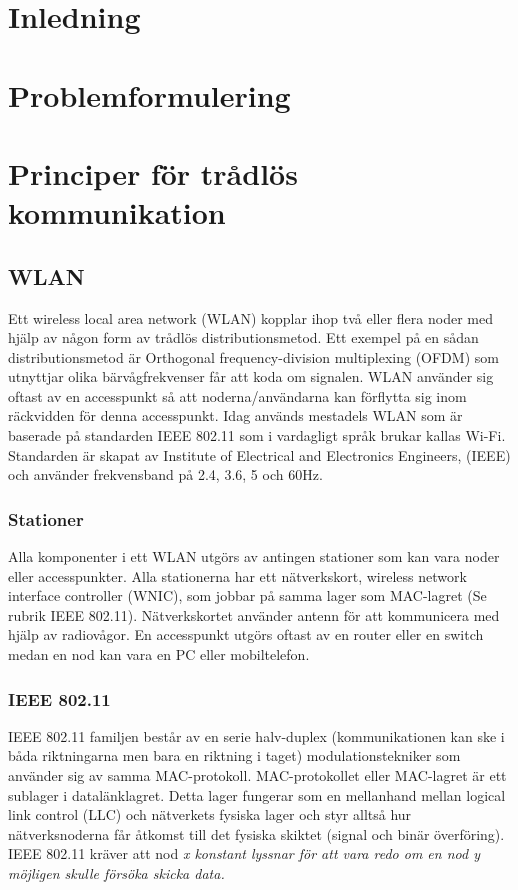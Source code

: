 \documentclass[a4paper,12pt,fleqn]{article}
\begin{document}
\addto\captionsswedish{\renewcommand{\contentsname}{Innehållsförteckning}}

\tableofcontents
\thispagestyle{fancy}
\newpage

\section{Inledning}
\section{Problemformulering}
\section{Principer för trådlös kommunikation}
\subsection{WLAN}
Ett wireless local area network (WLAN) kopplar ihop två eller flera noder med hjälp av någon form av trådlös distributionsmetod. Ett exempel på en sådan distributionsmetod är Orthogonal frequency-division multiplexing (OFDM) som utnyttjar olika bärvågfrekvenser får att koda om signalen. WLAN använder sig oftast av en accesspunkt så att noderna/användarna kan förflytta sig inom räckvidden för denna accesspunkt. Idag används mestadels WLAN som är baserade på standarden IEEE 802.11 som i vardagligt språk brukar kallas Wi-Fi. Standarden är skapat av Institute of Electrical and Electronics Engineers, (IEEE) och använder frekvensband på 2.4, 3.6, 5 och 60Hz.

\subsubsection{Stationer}
Alla komponenter i ett WLAN utgörs av antingen stationer som kan vara noder eller accesspunkter. Alla stationerna har ett nätverkskort, wireless network interface controller (WNIC), som jobbar på samma lager som MAC-lagret (Se rubrik IEEE 802.11). Nätverkskortet använder antenn för att kommunicera med hjälp av radiovågor. En accesspunkt utgörs oftast av en router eller en switch medan en nod kan vara en PC eller mobiltelefon. 

\subsubsection{IEEE 802.11}
IEEE 802.11 familjen består av en serie halv-duplex (kommunikationen kan ske i båda riktningarna men bara en riktning i taget) modulationstekniker som använder sig av samma MAC-protokoll. MAC-protokollet eller MAC-lagret är ett sublager i datalänklagret. Detta lager fungerar som en mellanhand mellan logical link control (LLC) och nätverkets fysiska lager och styr alltså hur nätverksnoderna får åtkomst till det fysiska skiktet (signal och binär överföring).
IEEE 802.11 kräver att nod \it{x} konstant lyssnar för att vara redo om en nod \it{y} möjligen skulle försöka skicka data. 
\end{document}

